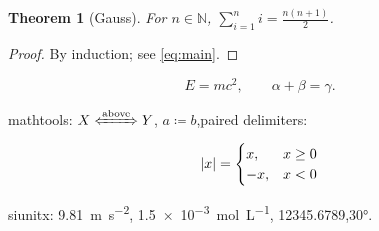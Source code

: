 \documentclass{article}
\newtheorem{theorem}{Theorem}
\DeclarePairedDelimiter{\abs}{\lvert}{\rvert}
\begin{document}
\begin{theorem}[Gauss]
  For $n \in \mathbb{N}$, $\sum_{i=1}^{n} i = \frac{n(n+1)}{2}$.
\end{theorem}
\begin{proof}
  By induction; see \eqref{eq:main}.
\end{proof}

\begin{equation}\label{eq:main}
  E = mc^2, \qquad \alpha + \beta = \gamma.
\end{equation}

mathtools: $X \xLeftrightarrow{\text{above}} Y$,\quad
$a \coloneqq b$,\quad paired delimiters:
\[ \abs{x} = \begin{cases} x, & x \ge 0 \\ -x, & x < 0 \end{cases} \]

siunitx: \qty{9.81}{\meter\per\second\squared},\quad
\qty{1.5e-3}{\mole\per\liter},\quad
\num{12345.6789},\quad \ang{30}.
\end{document}

